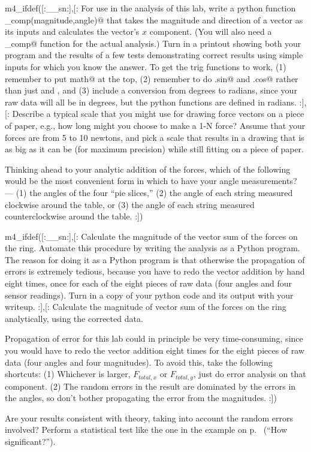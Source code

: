 m4_ifdef([:__sn:],[:%
\prelabquestion For use in the analysis of this lab, write a python function \verb@x_comp(magnitude,angle)@ that
takes the magnitude and direction of a vector as its inputs and calculates the vector's $x$ component.
(You will also need a \verb@y_comp@ function for the actual analysis.)
Turn in a printout showing both your program and the results of a few tests demonstrating correct results
using simple inputs for which you know the answer.
To get the trig functions to work, (1) remember to put \verb@import math@ at the top, (2) remember to do \verb@math.sin@
and \verb@math.cos@ rather than just \verb@sin@ and \verb@cos@, and (3) include a conversion from degrees to radians, since
your raw data will all be in degrees, but the python functions are defined in radians.
:],[:%
\prelabquestion  Describe a typical scale that you might use for drawing
force vectors on a piece of paper, e.g., how long might you
choose to make a 1-N force?  Assume that your forces are
from 5 to 10 newtons, and pick a scale that results in a drawing that
is as big as it can be (for maximum precision) while still fitting on
a piece of paper.

\prelabquestion Thinking ahead to your analytic addition of the forces,
which of the following would be the most convenient form in which to have
your angle measurements? --- (1) the angles of the four ``pie slices,''
(2) the angle of each string measured clockwise around the table,
or (3) the angle of each string measured counterclockwise around the table.
:])

\analysis

m4_ifdef([:__sn:],[:%
Calculate the magnitude of the vector sum of the forces on the
ring. Automate this procedure by writing the analysis as a Python program.
The reason for doing it as a Python program is that otherwise the propagation of errors
is extremely tedious, because you have to redo the vector addition by hand eight times,
once for each of the eight pieces of raw data (four angles and four sensor readings).
Turn in a copy of your python code and its output with your writeup. 
:],[:%
Calculate the magnitude of vector sum of the forces on the
ring analytically, using the corrected data.

Propagation of error for this lab could in principle be very time-consuming,
since you would have to redo the vector addition eight times for the eight
pieces of raw data (four angles and four magnitudes). 
To avoid this, take the following shortcuts: (1) Whichever is larger,
$F_{total,x}$ or $F_{total,y}$, just do error analysis on that component.
(2) The random errors in the result are dominated by the errors in the angles,
so don't bother propagating the error from the magnitudes.
:])

Are your results consistent with theory, taking into account
the random errors involved? Perform a statistical test like the
one in the example on p.~\pageref{eg:fine-structure} (``How significant?'').
